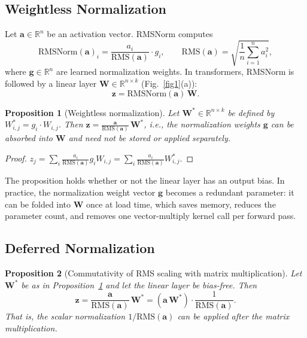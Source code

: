 \documentclass{article}
\newtheorem{proposition}{Proposition}
\begin{document}
\subsection{Weightless Normalization}
Let $\mathbf{a} \in \mathbb{R}^n$ be an activation vector. RMSNorm computes
\[
  \mathrm{RMSNorm}(\mathbf{a})_i = \frac{a_i}{\mathrm{RMS}(\mathbf{a})} \cdot g_i,
  \qquad
  \mathrm{RMS}(\mathbf{a}) = \sqrt{\frac{1}{n}\sum_{i=1}^n a_i^2},
\]
where $\mathbf{g} \in \mathbb{R}^n$ are learned normalization weights.
In transformers, RMSNorm is followed by a linear layer $\mathbf{W} \in \mathbb{R}^{n \times k}$ (Fig.~\ref{fig1}(a)):
\[
  \mathbf{z} = \mathrm{RMSNorm}(\mathbf{a})\, \mathbf{W}.
\]

\begin{proposition}[Weightless normalization]\label{prop:weightless}
Let $\mathbf{W}^* \in \mathbb{R}^{n \times k}$ be defined by $W^*_{i,j} = g_i \cdot W_{i,j}$.
Then $\mathbf{z} = \frac{\mathbf{a}}{\mathrm{RMS}(\mathbf{a})}\, \mathbf{W}^*$, i.e.,
the normalization weights $\mathbf{g}$ can be absorbed into $\mathbf{W}$ and need not
be stored or applied separately.
\end{proposition}

\begin{proof}
$z_j = \sum_i \frac{a_i}{\mathrm{RMS}(\mathbf{a})} g_i W_{i,j}
     = \sum_i \frac{a_i}{\mathrm{RMS}(\mathbf{a})} W^*_{i,j} $.
\end{proof}

The proposition holds whether or not the linear layer has an output bias.
In practice, the normalization weight vector $\mathbf{g}$ becomes
a redundant parameter: it can be folded into $\mathbf{W}$ once at load time, which saves
memory, reduces the parameter count, and removes one vector-multiply kernel call
per forward pass.

\subsection{Deferred Normalization}

\begin{proposition}[Commutativity of RMS scaling with matrix multiplication]\label{prop:commute}
Let $\mathbf{W}^*$ be as in Proposition~\ref{prop:weightless} and let the linear
layer be bias-free. Then
\[
  \mathbf{z}
  = \frac{\mathbf{a}}{\mathrm{RMS}(\mathbf{a})}\,\mathbf{W}^*
  = (\mathbf{a}\,\mathbf{W}^*)\cdot \frac{1}{\mathrm{RMS}(\mathbf{a})}.
\]
That is, the scalar normalization $1/\mathrm{RMS}(\mathbf{a})$ can be applied
\emph{after} the matrix multiplication.
\end{proposition}
\end{document}
